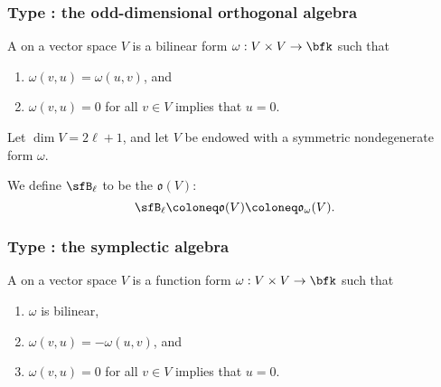 \documentclass{article}
\newcommand*\oalg{\ensuremath{\mathfrak{o}}}
\begin{document}
\subsubsection{Type \sfB: the odd-dimensional orthogonal algebra}

\begin{definition}
    A  on a vector space $V$ is a bilinear form $\omega: V \times V \to \bfk$ such that
    \begin{enumerate}[label=(\alph*)]
        \item 
            $\omega(v,u) = \omega(u,v)$, and
        \item 
            $\omega(v,u) = 0$ for all $v \in V$ implies that $u=0$.
    \end{enumerate}
\end{definition}

\begin{definition}
    Let $\dim V = 2\ell+1$, and let $V$ be endowed with a symmetric nondegenerate form $\omega$.

    We define $\sfB_\ell$ to be the  $\oalg(V)$:
    \[
        \sfB_\ell
        \coloneq
        \oalg(V)
        \coloneq
        \oalg_\omega(V).
    \]
\end{definition}

\subsubsection{Type \sfC: the symplectic algebra}

\begin{definition}
    A  on a vector space $V$ is a function form $\omega: V \times V \to \bfk$ such that
    \begin{enumerate}[label=(\alph*)]
        \item
            $\omega$ is bilinear,
        \item 
            $\omega(v,u) = -\omega(u,v)$, and
        \item 
            $\omega(v,u) = 0$ for all $v \in V$ implies that $u=0$.
    \end{enumerate}
\end{definition}
\end{document}
